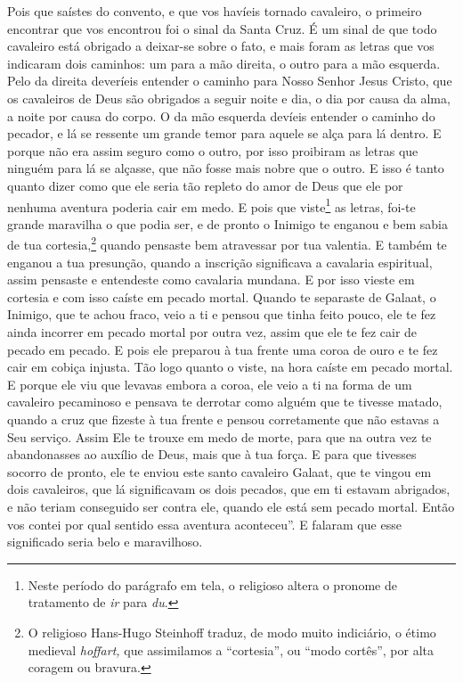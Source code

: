 Pois que saístes do convento, e que vos havíeis tornado cavaleiro, o primeiro
encontrar que vos encontrou foi o sinal da Santa Cruz. É um sinal de que todo
cavaleiro está obrigado a deixar-se sobre o fato, e mais foram as letras que
vos indicaram dois caminhos: um para a mão direita, o outro para a mão esquerda.
Pelo da direita deveríeis entender o caminho para Nosso Senhor Jesus Cristo,
que os cavaleiros de Deus são obrigados a seguir noite e dia, o dia por causa
da alma, a noite por causa do corpo. O da mão esquerda devíeis entender o
caminho do pecador, e lá se ressente um grande temor para aquele se alça para
lá dentro. E porque não era assim seguro como o outro, por isso proibiram as
letras que ninguém para lá se alçasse, que não fosse mais nobre que o outro. E
isso é tanto quanto dizer como que ele seria tão repleto do amor de Deus que
ele por nenhuma aventura poderia cair em medo. E pois que viste\footnote{ Neste
período do parágrafo em tela, o religioso altera o pronome de tratamento de
\textit{ir}  para \textit{du}.}  as letras, foi-te
grande maravilha o que podia ser, e de pronto o Inimigo te enganou e bem sabia
de tua cortesia,\footnote{ O religioso Hans-Hugo Steinhoff traduz, de modo muito
indiciário, o étimo medieval \textit{hoffart,} que assimilamos a “cortesia”, ou
 “modo cortês”, por alta coragem ou bravura.}  quando
pensaste bem atravessar por tua valentia. E também te enganou a tua presunção,
quando a inscrição significava a cavalaria espiritual, assim pensaste e
entendeste como cavalaria mundana. E por isso vieste em cortesia e com isso
caíste em pecado mortal. Quando te separaste de Galaat, o Inimigo, que te achou
fraco, veio a ti e pensou que tinha feito pouco, ele te fez ainda incorrer em
pecado mortal por outra vez, assim que ele te fez cair de pecado em pecado. E
pois ele preparou à tua frente uma coroa de ouro e te fez cair em cobiça
injusta. Tão logo quanto o viste, na hora caíste em pecado mortal. E porque ele
viu que levavas embora a coroa, ele veio a ti na forma de um cavaleiro
pecaminoso e pensava te derrotar como alguém que te tivesse matado, quando a cruz
que fizeste à tua frente e pensou corretamente que não estavas a Seu serviço.
Assim Ele te trouxe em medo de morte, para que na outra vez te abandonasses ao
auxílio de Deus, mais que à tua força. E para que tivesses socorro de pronto,
ele te enviou este santo cavaleiro Galaat, que te vingou em dois cavaleiros,
que lá significavam os dois pecados, que em ti estavam abrigados, e não teriam
conseguido ser contra ele, quando ele está sem pecado mortal. Então vos contei
por qual sentido essa aventura aconteceu”. E falaram que esse
significado seria belo e maravilhoso.

